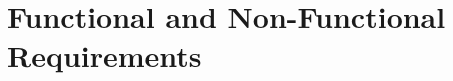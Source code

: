 \documentclass[11pt,a4paper]{report}
\begin{document}
\chapter{Functional and Non-Functional Requirements}




\end{document}
